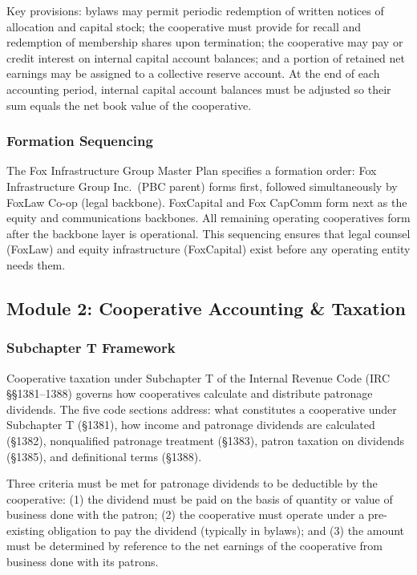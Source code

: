 \documentclass[11pt,letterpaper]{article}
\begin{document}
Key provisions: bylaws may permit periodic redemption of written notices of allocation and capital stock; the cooperative must provide for recall and redemption of membership shares upon termination; the cooperative may pay or credit interest on internal capital account balances; and a portion of retained net earnings may be assigned to a collective reserve account. At the end of each accounting period, internal capital account balances must be adjusted so their sum equals the net book value of the cooperative.

\subsubsection{Formation Sequencing}

The Fox Infrastructure Group Master Plan specifies a formation order: Fox Infrastructure Group Inc.\ (PBC parent) forms first, followed simultaneously by FoxLaw Co-op (legal backbone). FoxCapital and Fox CapComm form next as the equity and communications backbones. All remaining operating cooperatives form after the backbone layer is operational. This sequencing ensures that legal counsel (FoxLaw) and equity infrastructure (FoxCapital) exist before any operating entity needs them.

\subsection{Module 2: Cooperative Accounting \& Taxation}

\subsubsection{Subchapter T Framework}

Cooperative taxation under Subchapter T of the Internal Revenue Code (IRC \S\S 1381--1388) governs how cooperatives calculate and distribute patronage dividends. The five code sections address: what constitutes a cooperative under Subchapter T (\S1381), how income and patronage dividends are calculated (\S1382), nonqualified patronage treatment (\S1383), patron taxation on dividends (\S1385), and definitional terms (\S1388).

Three criteria must be met for patronage dividends to be deductible by the cooperative: (1) the dividend must be paid on the basis of quantity or value of business done with the patron; (2) the cooperative must operate under a pre-existing obligation to pay the dividend (typically in bylaws); and (3) the amount must be determined by reference to the net earnings of the cooperative from business done with its patrons.
\end{document}
